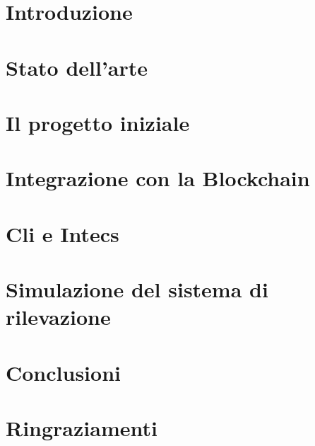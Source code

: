 \documentclass[12pt,oneside]{report}
\begin{document}


% 

\tableofcontents

\listoffigures

\chapter{Introduzione}


\chapter{Stato dell'arte}\label{2.statoarte}


\chapter{Il progetto iniziale}\label{3.progetto iniziale}


\chapter{Integrazione con la Blockchain}\label{4.integriamo la blockchain}


\chapter{Cli e Intecs}\label{5.cli e intecs}


\chapter{Simulazione del sistema di rilevazione}\label{6.simulazione del progetto}


\chapter{Conclusioni}\label{7.conclusioni}


\chapter*{Ringraziamenti}
\rhead{}


\printbibliography[
heading=bibintoc,
title={Bibliografia}
]

\end{document}
